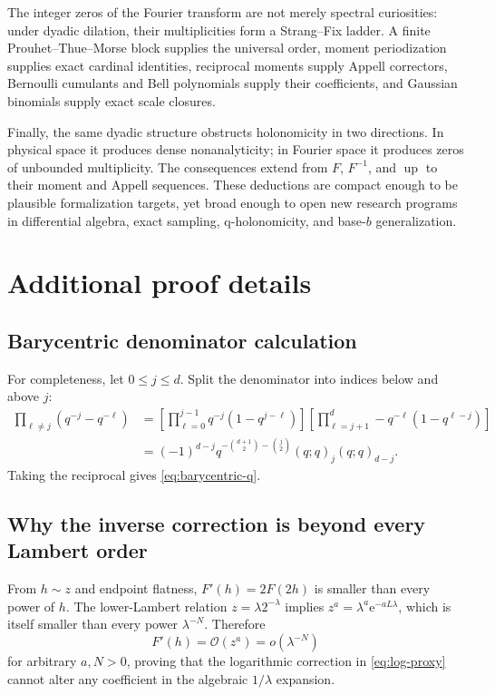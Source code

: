 \documentclass[11pt,oneside]{article}
\theoremstyle{definition}
\theoremstyle{remark}
\newcommand{\Up}{\operatorname{up}}
\newcommand{\e}{\mathrm e}
\newcommand{\bigO}{\mathcal O}
\newcommand{\smallo}{o}
\begin{document}
The integer zeros of the Fourier transform are not merely spectral curiosities: under dyadic dilation, their multiplicities form a Strang--Fix ladder.  A finite Prouhet--Thue--Morse block supplies the universal order, moment periodization supplies exact cardinal identities, reciprocal moments supply Appell correctors, Bernoulli cumulants and Bell polynomials supply their coefficients, and Gaussian binomials supply exact scale closures.

Finally, the same dyadic structure obstructs holonomicity in two directions.  In physical space it produces dense nonanalyticity; in Fourier space it produces zeros of unbounded multiplicity.  The consequences extend from $F$, $F^{-1}$, and $\Up$ to their moment and Appell sequences.  These deductions are compact enough to be plausible formalization targets, yet broad enough to open new research programs in differential algebra, exact sampling, q-holonomicity, and base-$b$ generalization.

\appendix

\section{Additional proof details}
\label{app:proof-details}

\subsection{Barycentric denominator calculation}
For completeness, let $0\le j\le d$.  Split the denominator into indices below and above $j$:
\begin{align*}
 \prod_{\ell\ne j}(q^{-j}-q^{-\ell})
 &=\left[\prod_{\ell=0}^{j-1}q^{-j}(1-q^{j-\ell})\right]
   \left[\prod_{\ell=j+1}^{d}-q^{-\ell}(1-q^{\ell-j})\right]\\
 &=(-1)^{d-j}q^{-\binom{d+1}{2}-\binom j2}
   (q;q)_j(q;q)_{d-j}.
\end{align*}
Taking the reciprocal gives \eqref{eq:barycentric-q}.

\subsection{Why the inverse correction is beyond every Lambert order}
From $h\sim z$ and endpoint flatness, $F'(h)=2F(2h)$ is smaller than every power of $h$.  The lower-Lambert relation $z=\lambda2^{-\lambda}$ implies
$z^a=\lambda^a\e^{-aL\lambda}$, which is itself smaller than every power $\lambda^{-N}$.  Therefore
\[
 F'(h)=\bigO(z^a)=\smallo(\lambda^{-N})
\]
for arbitrary $a,N>0$, proving that the logarithmic correction in \eqref{eq:log-proxy} cannot alter any coefficient in the algebraic $1/\lambda$ expansion.
\end{document}
